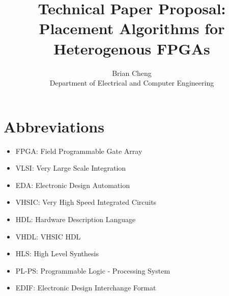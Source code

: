 \documentclass{article}
\begin{document}
\title{Technical Paper Proposal: \\ Placement Algorithms for Heterogenous FPGAs}
\author{Brian Cheng \\ Department of Electrical and Computer Engineering}


\date{}
\maketitle

\section{Abbreviations}
\begin{itemize}[label={--}, left=0.25cm] %
    \item FPGA: Field Programmable Gate Array
    \item VLSI: Very Large Scale Integration
    \item EDA: Electronic Design Automation
    \item VHSIC: Very High Speed Integrated Circuits
    \item HDL: Hardware Description Language
    \item VHDL: VHSIC HDL
    \item HLS: High Level Synthesis
    \item PL-PS: Programmable Logic - Processing System
    \item EDIF: Electronic Design Interchange Format
\end{itemize}
\end{document}
